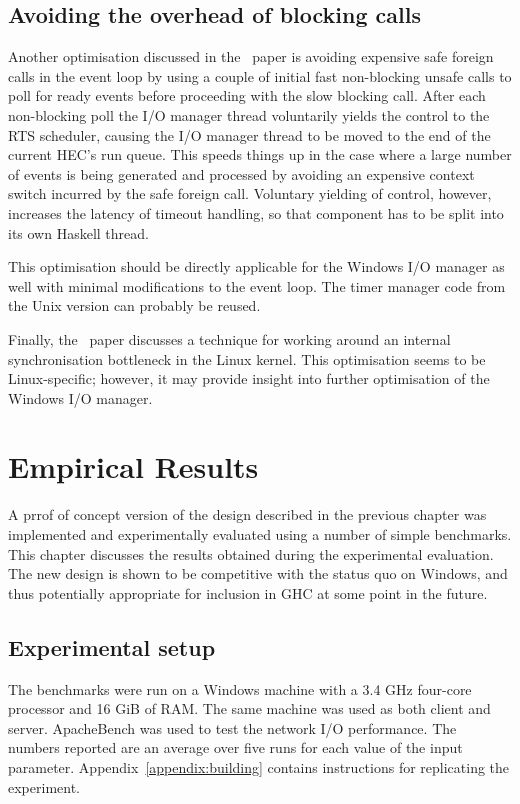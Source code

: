 \documentclass[a4paper,11pt,oneside]{report}
\begin{document}
\section{Avoiding the overhead of blocking calls}

Another optimisation discussed in the~\cite{bib:voellmy} paper is avoiding
expensive safe foreign calls in the event loop by using a couple of initial fast
non-blocking unsafe calls to poll for ready events before proceeding with the
slow blocking call. After each non-blocking poll the I/O manager thread
voluntarily yields the control to the RTS scheduler, causing the I/O manager
thread to be moved to the end of the current HEC's run queue. This speeds things
up in the case where a large number of events is being generated and processed
by avoiding an expensive context switch incurred by the safe foreign
call. Voluntary yielding of control, however, increases the latency of timeout
handling, so that component has to be split into its own Haskell thread.

This optimisation should be directly applicable for the Windows I/O manager as
well with minimal modifications to the event loop. The timer manager code from
the Unix version can probably be reused.

Finally, the~\cite{bib:voellmy} paper discusses a technique for working around
an internal synchronisation bottleneck in the Linux kernel. This optimisation
seems to be Linux-specific; however, it may provide insight into further
optimisation of the Windows I/O manager.

\chapter{Empirical Results}
\label{chap:evaluation}

A prrof of concept version of the design described in the previous chapter was
implemented and experimentally evaluated using a number of simple
benchmarks. This chapter discusses the results obtained during the experimental
evaluation. The new design is shown to be competitive with the status quo on
Windows, and thus potentially appropriate for inclusion in GHC at some point in
the future.

\section{Experimental setup}

The benchmarks were run on a Windows machine with a 3.4 GHz four-core processor
and 16 GiB of RAM. The same machine was used as both client and
server. ApacheBench was used to test the network I/O performance. The numbers
reported are an average over five runs for each value of the input
parameter. Appendix~\ref{appendix:building} contains instructions for
replicating the experiment.
\end{document}
